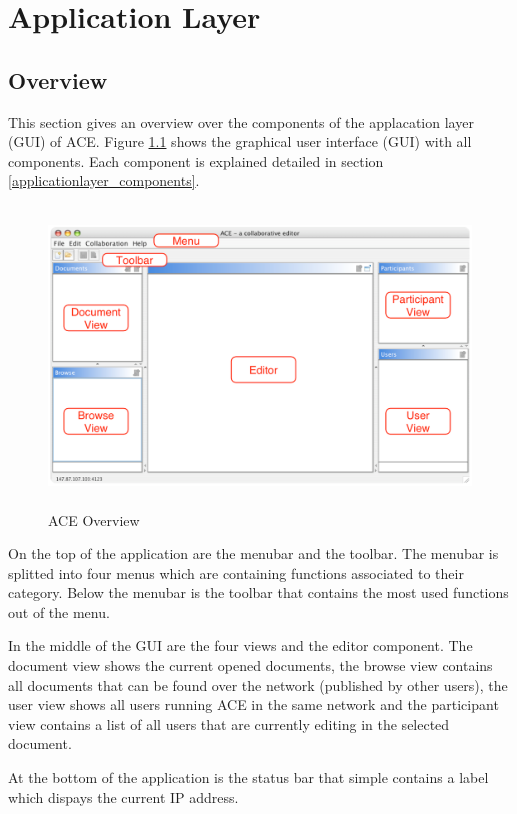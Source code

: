 \chapter{Application Layer}
\label{chapter:applicationlayer}

\section{Overview}
This section gives an overview over the components of the applacation layer (GUI) of ACE. Figure \ref{applicationlayer_ace_overview} shows the graphical user interface (GUI) with all components. Each component is explained detailed in section \ref{applicationlayer_components}.
\begin{figure}[H]
\begin{center}
  \includegraphics[height=3.135in, width=5.01in]{../images/finalreport/application_ace_overview.eps}
\caption{ACE Overview}
\label{applicationlayer_ace_overview}
\end{center}
\end{figure}
On the top of the application are the menubar and the toolbar. The menubar is splitted into four menus which are containing functions associated to their category. Below the menubar is the toolbar that contains the most used functions out of the menu.

In the middle of the GUI are the four views and the editor component. The document view shows the current opened documents, the browse view contains all documents that can be found over the network (published by other users), the user view shows all users running ACE in the same network and the participant view contains a list of all users that are currently editing in the selected document.

At the bottom of the application is the status bar that simple contains a label which dispays the current IP address.

